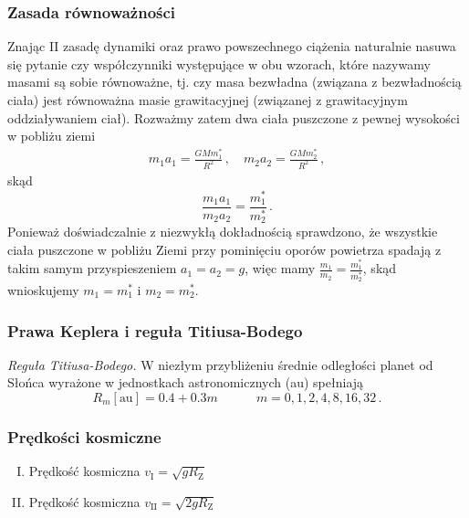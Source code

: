 \documentclass[../main.tex]{subfiles}
\begin{document}
\subsubsection{Zasada równoważności}
Znając II zasadę dynamiki oraz prawo powszechnego ciążenia naturalnie nasuwa się pytanie czy
współczynniki występujące w obu wzorach, które nazywamy masami są sobie równoważne, tj. czy masa
bezwładna (związana z bezwładnością ciała) jest równoważna masie grawitacyjnej (związanej z
grawitacyjnym oddziaływaniem ciał). Rozważmy zatem dwa ciała puszczone z pewnej wysokości w pobliżu
ziemi
\begin{equation*}
    \begin{split}
        m_1a_1=\frac{GMm_1^*}{R^2}\,,\quad m_2a_2=\frac{GMm_2^*}{R^2}\,,
    \end{split}
\end{equation*}
skąd
\begin{equation*}
    \frac{m_1a_1}{m_2a_2}=\frac{m_1^*}{m_2^*}\,.
\end{equation*}
Ponieważ doświadczalnie z niezwykłą dokładnością sprawdzono, że wszystkie ciała puszczone w pobliżu
Ziemi przy pominięciu oporów powietrza spadają z takim samym przyspieszeniem \(a_1=a_2=g\), więc
mamy \(\frac{m_1}{m_2}=\frac{m_1^*}{m_2^*}\), skąd wnioskujemy \(m_1=m_1^*\) i \(m_2=m_2^*\).

\subsubsection{Prawa Keplera i reguła Titiusa-Bodego}
\noindent{}
\medskip

\textit{Reguła Titiusa-Bodego.} W niezłym przybliżeniu średnie odległości planet od Słońca wyrażone
w jednostkach astronomicznych (au) spełniają
\begin{equation*}
    R_{m}[\text{au}]=0.4+0.3m\quad\quad\quad m=0,1,2,4,8,16,32\,.
\end{equation*}
\subsubsection*{Prędkości kosmiczne}
\begin{enumerate}[I.]
    \item Prędkość kosmiczna \(v_\text{I}=\sqrt{gR_\text{Z}}\)
    \item Prędkość kosmiczna \(v_\text{II}=\sqrt{2gR_\text{Z}}\)
\end{enumerate}
\end{document}
